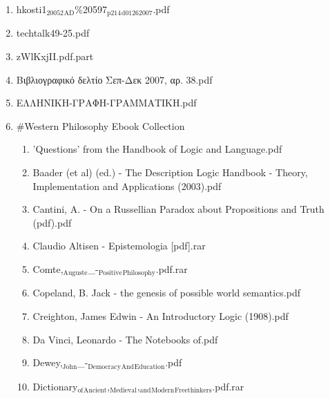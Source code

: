 \documentclass[11pt]{article}
\begin{document}
\begin{enumerate}
\begin{enumerate}
\begin{enumerate}
\begin{enumerate}
\item hkosti1$_{\text{20052}}$$_{\text{AD}}$\%20597$_{\text{p214}}$$_{\text{d01262007}}$.pdf
\label{sec-1-1-1-1-7-3-9}

\item techtalk49-25.pdf
\label{sec-1-1-1-1-7-3-10}

\item zWlKxjII.pdf.part
\label{sec-1-1-1-1-7-3-11}

\item Βιβλιογραφικό δελτίο Σεπ-Δεκ 2007, αρ. 38.pdf
\label{sec-1-1-1-1-7-3-12}

\item ΕΛΛΗΝΙΚΗ-ΓΡΑΦΗ-ΓΡΑΜΜΑΤΙΚΗ.pdf
\label{sec-1-1-1-1-7-3-13}

\item \#Western Philosophy Ebook Collection
\label{sec-1-1-1-1-7-3-14}
\begin{enumerate}
\item 'Questions' from the Handbook of Logic and Language.pdf
\label{sec-1-1-1-1-7-3-14-1}

\item Baader (et al) (ed.) - The Description Logic Handbook - Theory, Implementation and Applications (2003).pdf
\label{sec-1-1-1-1-7-3-14-2}

\item Cantini, A. - On a Russellian Paradox about Propositions and Truth (pdf).pdf
\label{sec-1-1-1-1-7-3-14-3}

\item Claudio Altisen - Epistemologia [pdf].rar
\label{sec-1-1-1-1-7-3-14-4}

\item Comte,$_{\text{Auguste}}$\_-$_{\text{Positive}}$$_{\text{Philosophy}}$.pdf.rar
\label{sec-1-1-1-1-7-3-14-5}

\item Copeland, B. Jack - the genesis of possible world semantics.pdf
\label{sec-1-1-1-1-7-3-14-6}

\item Creighton, James Edwin  - An Introductory Logic (1908).pdf
\label{sec-1-1-1-1-7-3-14-7}

\item Da Vinci, Leonardo - The Notebooks of.pdf
\label{sec-1-1-1-1-7-3-14-8}

\item Dewey,$_{\text{John}}$\_-$_{\text{Democracy}}$$_{\text{And}}$$_{\text{Education}}$.pdf
\label{sec-1-1-1-1-7-3-14-9}

\item Dictionary$_{\text{of}}$$_{\text{Ancient}}$,$_{\text{Medieval}}$,$_{\text{and}}$$_{\text{Modern}}$$_{\text{Freethinkers}}$.pdf.rar
\label{sec-1-1-1-1-7-3-14-10}


\end{enumerate}
\end{enumerate}
\end{enumerate}
\end{enumerate}
\end{enumerate}
\end{document}
